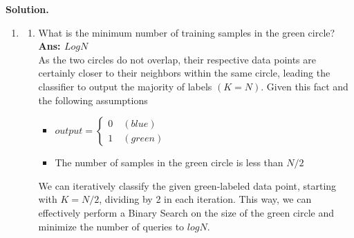 \documentclass{article}
\theoremstyle{definition}
\theoremstyle{remark}
\begin{document}
\begin{enumerate}[font={\Large\bfseries},left=0pt]
\textbf{Solution.}
    \begin{tcolorbox}
        \begin{enumerate}
        \item  
            \begin{enumerate}
                \item What is the minimum number of training samples in the green circle? \\
                 \textbf{Ans: $LogN$} \\
As the two circles do not overlap, their respective data points are certainly closer to their neighbors within the same circle, leading the classifier to output the majority of labels $(K = N)$. Given this fact and the following assumptions \\
                    \begin{itemize}
                        \item $output = 
                        \begin{cases}
                        0 \quad (blue) \\
                        1 \quad (green)
                        \end{cases}$
                        \item The number of samples in the green circle is less than $N/2$ \\
                    \end{itemize}

We can iteratively classify the given green-labeled data point, starting with $K = N/2$, dividing by 2 in each iteration. This way, we can effectively perform a Binary Search on the size of the green circle and minimize the number of queries to $logN$. \\


\end{enumerate}
\end{enumerate}
\end{tcolorbox}
\end{enumerate}
\end{document}
